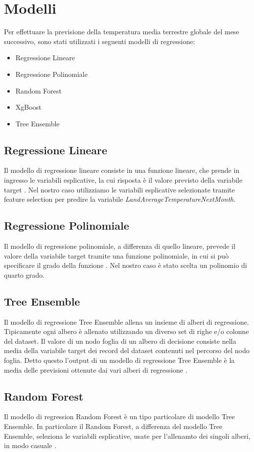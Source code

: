 \documentclass[12pt, a4paper, twocolumn]{article} %
\begin{document}
\section{Modelli}
Per effettuare la previsione della temperatura media terrestre globale del mese successivo, sono stati utilizzati i seguenti modelli di regressione:
\begin{itemize}
	\item Regressione Lineare
	\item Regressione Polinomiale
	\item Random Forest
	\item XgBoost
	\item Tree Ensemble
\end{itemize}

\subsection{Regressione Lineare}
Il modello di regressione lineare consiste in una funzione lineare, che prende in ingresso le variabili esplicative, la cui risposta è il valore previsto della variabile target \cite{mlbook}. Nel nostro caso utilizziamo le variabili esplicative selezionate tramite feature selection per predire la variabile \textit{LandAverageTemperatureNextMonth}.

\subsection{Regressione Polinomiale}
Il modello di regressione polinomiale, a differenza di quello lineare, prevede il valore della variabile target tramite una funzione polinomiale, in cui si può specificare il grado della funzione \cite{mlbook}. Nel nostro caso è stato scelta un polinomio di quarto grado.
\subsection{Tree Ensemble}
Il modello di regressione Tree Ensemble allena un insieme di alberi di regressione. Tipicamente ogni albero è allenato utilizzando un diverso set di righe e/o colonne del dataset. Il valore di un nodo foglia di un albero di decisione consiste nella media della variabile target dei record del dataset contenuti nel percorso del nodo foglia. Detto questo l'output di un modello di regressione Tree Ensemble è la media delle previsioni ottenute dai vari alberi di regressione \cite{treeensemble}.
\subsection{Random Forest}
Il modello di regression Random Forest è un tipo particolare di modello Tree Ensemble. In particolare il Random Forest, a differenza del modello Tree Ensemble, seleziona le variabili esplicative, usate per l'allenamto dei singoli alberi, in modo casuale \cite{randomforest}.
\end{document}
